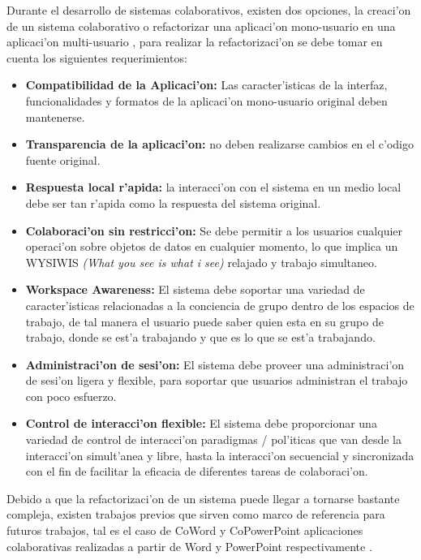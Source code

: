 \medskip
Durante el desarrollo de sistemas colaborativos, existen dos opciones, la creaci'on de un sistema colaborativo o refactorizar una aplicaci'on mono-usuario en una aplicaci'on multi-usuario \cite{xia2006leveraging}, para realizar la refactorizaci'on se debe tomar en cuenta los siguientes requerimientos:

\begin{itemize}
	\item \textbf{Compatibilidad de la Aplicaci'on:} Las caracter'isticas de la interfaz, funcionalidades y formatos de la aplicaci'on mono-usuario original deben mantenerse.

	\item \textbf{Transparencia de la aplicaci'on:} no deben realizarse cambios en el c'odigo fuente original.

	\item \textbf{Respuesta local r'apida:} la interacci'on con el sistema en un medio local debe ser tan r'apida como la respuesta del sistema original.

	\item \textbf{Colaboraci'on sin restricci'on:} Se debe permitir a los usuarios cualquier operaci'on sobre objetos de datos en cualquier momento, lo que implica un WYSIWIS \textit{(What you see is what i see)} relajado y trabajo simultaneo.
	
	\item \textbf{Workspace Awareness:} El sistema debe soportar una variedad de caracter'isticas relacionadas a la conciencia de grupo dentro de los espacios de trabajo, de tal manera el usuario puede saber quien esta en su grupo de trabajo, donde se est'a trabajando y que es lo que se est'a trabajando.

	\item \textbf{Administraci'on de sesi'on:} El sistema debe proveer una administraci'on de sesi'on ligera y flexible, para soportar que usuarios administran el trabajo con poco esfuerzo.

	\item \textbf{Control de interacci'on flexible:} El sistema debe proporcionar una variedad de control de interacci'on paradigmas / pol'iticas que van desde la interacci'on simult'anea y libre, hasta la interacci'on secuencial y sincronizada con el fin de facilitar la eficacia de diferentes tareas de colaboraci'on.

\end{itemize}

\medskip
Debido a que la refactorizaci'on de un sistema puede llegar a tornarse bastante compleja, existen trabajos previos que sirven como marco de referencia para futuros trabajos, tal es el caso de CoWord y CoPowerPoint aplicaciones colaborativas realizadas a partir de Word y PowerPoint respectivamente \cite{xia2006leveraging}.

